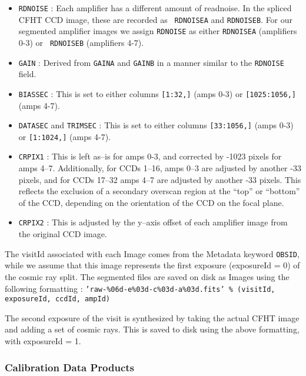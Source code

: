 \begin{itemize}

\item {\tt RDNOISE} : Each amplifier has a different amount of
readnoise.  In the spliced CFHT CCD image, these are recorded as {\tt
RDNOISEA} and {\tt RDNOISEB}.  For our segmented amplifier images we
assign {\tt RDNOISE} as either {\tt RDNOISEA} (amplifiers 0-3) or {\tt
RDNOISEB} (amplifiers 4-7).

\item {\tt GAIN} : Derived from {\tt GAINA} and {\tt GAINB} in a
manner similar to the {\tt RDNOISE} field.

\item {\tt BIASSEC} : This is set to either columns {\tt [1:32,]} (amps
0-3) or {\tt [1025:1056,]} (amps 4-7).

\item {\tt DATASEC} and {\tt TRIMSEC} : This is set to either columns
{\tt [33:1056,]} (amps 0-3) or {\tt [1:1024,]} (amps 4-7).

\item {\tt CRPIX1} : This is left as--is for amps 0-3, and corrected
by -1023 pixels for amps 4--7.  Additionally, for CCDs 1--16, amps
0--3 are adjusted by another -33 pixels, and for CCDs 17--32 amps 4--7
are adjusted by another -33 pixels.  This reflects the exclusion of a
secondary overscan region at the ``top'' or ``bottom'' of the CCD,
depending on the orientation of the CCD on the focal plane.

\item {\tt CRPIX2} : This is adjusted by the y--axis offset of each
amplifier image from the original CCD image.

\end{itemize}

The visitId associated with each Image comes from the Metadata keyword
{\tt OBSID}, while we assume that this image represents the first
exposure (exposureId = 0) of the cosmic ray split.  The segmented
files are saved on disk as Images using the following formatting :
{\tt 'raw-\%06d-e\%03d-c\%03d-a\%03d.fits' \% (visitId, exposureId,
ccdId, ampId)}

The second exposure of the visit is synthesized by taking the actual
CFHT image and adding a set of cosmic rays.  This is saved to disk
using the above formatting, with exposureId = 1.

\subsubsection{Calibration Data Products}

